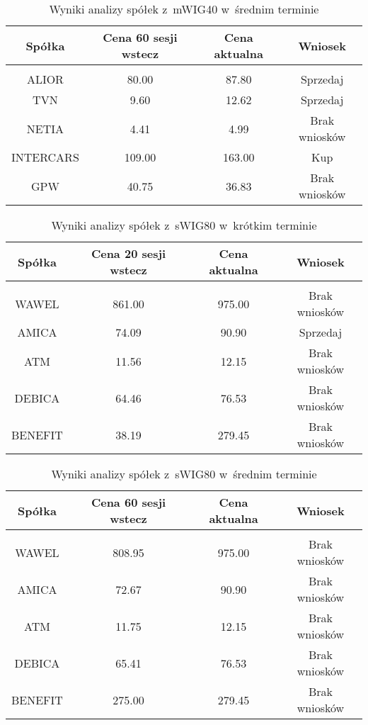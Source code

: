 \begin{table}[H]
	\centering
	\begin{tabular}{ c c c c}
	Spółka & Cena 60 sesji wstecz & Cena aktualna & Wniosek \\ \hline \\
	ALIOR & 80.00 & 87.80 & Sprzedaj\\
	TVN & 9.60 & 12.62 & Sprzedaj \\
	NETIA & 4.41 & 4.99 & Brak wniosków \\
	INTERCARS & 109.00 & 163.00 & Kup \\
	GPW & 40.75 & 36.83 & Brak wniosków \\
	\end{tabular}
	\caption{Wyniki analizy spółek z~mWIG40 w~średnim terminie}
\end{table}

\begin{table}[H]
	\centering
	\begin{tabular}{ c c c c}
	Spółka & Cena 20 sesji wstecz & Cena aktualna & Wniosek \\ \hline \\
	WAWEL & 861.00 & 975.00 & Brak wniosków \\
	AMICA & 74.09 & 90.90 & Sprzedaj \\
	ATM & 11.56 & 12.15 & Brak wniosków \\
	DEBICA & 64.46 & 76.53 & Brak wniosków \\
	BENEFIT & 38.19 & 279.45 & Brak wniosków \\
	\end{tabular}
	\caption{Wyniki analizy spółek z~sWIG80 w~krótkim terminie}
\end{table}

\begin{table}[H]
	\centering
	\begin{tabular}{ c c c c}
	Spółka & Cena 60 sesji wstecz & Cena aktualna & Wniosek \\ \hline \\
	WAWEL & 808.95 & 975.00 & Brak wniosków \\
	AMICA & 72.67 & 90.90 & Brak wniosków \\
	ATM & 11.75 & 12.15 & Brak wniosków \\
	DEBICA & 65.41 & 76.53 & Brak wniosków \\
	BENEFIT & 275.00 & 279.45 & Brak wniosków \\
	\end{tabular}
	\caption{Wyniki analizy spółek z~sWIG80 w~średnim terminie}
\end{table}